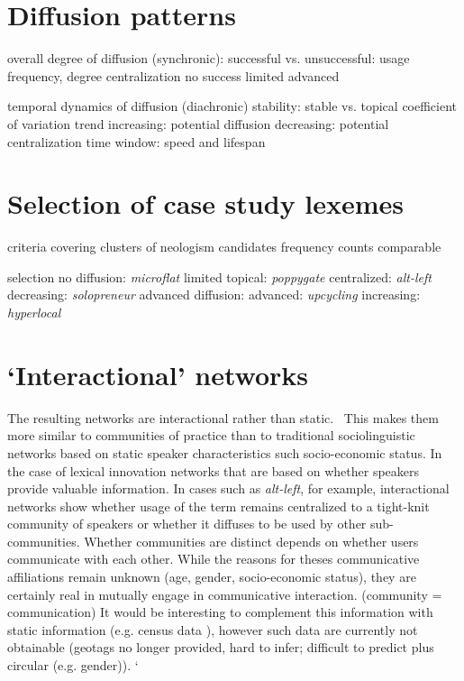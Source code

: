 \section{Diffusion patterns}

  overall degree of diffusion (synchronic): successful vs. unsuccessful: usage frequency, degree centralization
    no success
    limited
    advanced

  temporal dynamics of diffusion (diachronic)
    stability: stable vs. topical coefficient of variation
    trend
    increasing: potential diffusion
    decreasing: potential centralization
    time window: speed and lifespan


\section{Selection of case study lexemes}

  criteria
    covering clusters of neologism candidates
    frequency counts comparable

  selection
    no diffusion: \emph{microflat}
    limited
    topical: \emph{poppygate}
    centralized: \emph{alt-left}
    decreasing: \emph{solopreneur}
    advanced diffusion:
    advanced: \emph{upcycling}
    increasing: \emph{hyperlocal}

\section{`Interactional' networks}

      The resulting networks are interactional rather than static.~\parencite{Goel2016SocialDynamics} This makes them more similar to communities of practice than to traditional sociolinguistic networks based on static speaker characteristics such socio-economic status.
      In the case of lexical innovation networks that are based on whether speakers provide valuable information. In cases such as \emph{alt-left}, for example, interactional networks show whether usage of the term remains centralized to a tight-knit community of speakers or whether it diffuses to be used by other sub-communities.
      Whether communities are distinct depends on whether users communicate with each other. While the reasons for theses communicative affiliations remain unknown (age, gender, socio-economic status), they are certainly real in mutually engage in communicative interaction. (community = communication)
      It would be interesting to complement this information with static information (e.g. census data \parencite{Eisenstein2014DiffusionLexical}), however such data are currently not obtainable (geotags no longer provided, hard to infer; difficult to predict plus circular (e.g. gender)).
`
